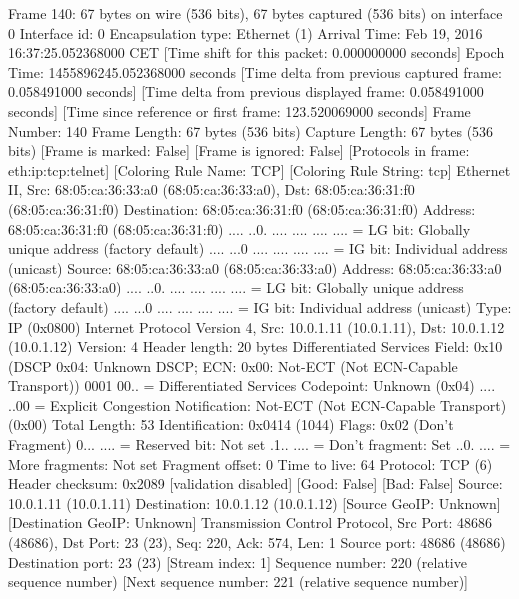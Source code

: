 Frame 140: 67 bytes on wire (536 bits), 67 bytes captured (536 bits) on interface 0
    Interface id: 0
    Encapsulation type: Ethernet (1)
    Arrival Time: Feb 19, 2016 16:37:25.052368000 CET
    [Time shift for this packet: 0.000000000 seconds]
    Epoch Time: 1455896245.052368000 seconds
    [Time delta from previous captured frame: 0.058491000 seconds]
    [Time delta from previous displayed frame: 0.058491000 seconds]
    [Time since reference or first frame: 123.520069000 seconds]
    Frame Number: 140
    Frame Length: 67 bytes (536 bits)
    Capture Length: 67 bytes (536 bits)
    [Frame is marked: False]
    [Frame is ignored: False]
    [Protocols in frame: eth:ip:tcp:telnet]
    [Coloring Rule Name: TCP]
    [Coloring Rule String: tcp]
Ethernet II, Src: 68:05:ca:36:33:a0 (68:05:ca:36:33:a0), Dst: 68:05:ca:36:31:f0 (68:05:ca:36:31:f0)
    Destination: 68:05:ca:36:31:f0 (68:05:ca:36:31:f0)
        Address: 68:05:ca:36:31:f0 (68:05:ca:36:31:f0)
        .... ..0. .... .... .... .... = LG bit: Globally unique address (factory default)
        .... ...0 .... .... .... .... = IG bit: Individual address (unicast)
    Source: 68:05:ca:36:33:a0 (68:05:ca:36:33:a0)
        Address: 68:05:ca:36:33:a0 (68:05:ca:36:33:a0)
        .... ..0. .... .... .... .... = LG bit: Globally unique address (factory default)
        .... ...0 .... .... .... .... = IG bit: Individual address (unicast)
    Type: IP (0x0800)
Internet Protocol Version 4, Src: 10.0.1.11 (10.0.1.11), Dst: 10.0.1.12 (10.0.1.12)
    Version: 4
    Header length: 20 bytes
    Differentiated Services Field: 0x10 (DSCP 0x04: Unknown DSCP; ECN: 0x00: Not-ECT (Not ECN-Capable Transport))
        0001 00.. = Differentiated Services Codepoint: Unknown (0x04)
        .... ..00 = Explicit Congestion Notification: Not-ECT (Not ECN-Capable Transport) (0x00)
    Total Length: 53
    Identification: 0x0414 (1044)
    Flags: 0x02 (Don't Fragment)
        0... .... = Reserved bit: Not set
        .1.. .... = Don't fragment: Set
        ..0. .... = More fragments: Not set
    Fragment offset: 0
    Time to live: 64
    Protocol: TCP (6)
    Header checksum: 0x2089 [validation disabled]
        [Good: False]
        [Bad: False]
    Source: 10.0.1.11 (10.0.1.11)
    Destination: 10.0.1.12 (10.0.1.12)
    [Source GeoIP: Unknown]
    [Destination GeoIP: Unknown]
Transmission Control Protocol, Src Port: 48686 (48686), Dst Port: 23 (23), Seq: 220, Ack: 574, Len: 1
    Source port: 48686 (48686)
    Destination port: 23 (23)
    [Stream index: 1]
    Sequence number: 220    (relative sequence number)
    [Next sequence number: 221    (relative sequence number)]
